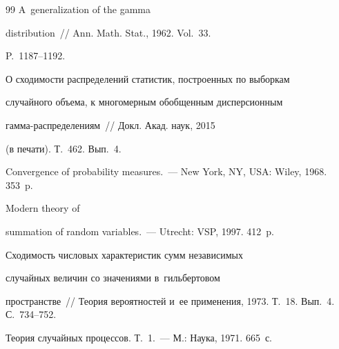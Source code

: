 {{\begin{thebibliography}{99}
 A~generalization of the gamma


distribution~/\!\!/ Ann. Math. Stat., 1962. Vol.~33.


P.~1187--1192.









О сходимости распределений статистик, построенных по выборкам


случайного объема, к многомерным обобщенным дисперсионным


гам\-ма-рас\-пре\-де\-ле\-ни\-ям~/\!\!/ Докл. Акад. наук, 2015


(в печати). Т.~462. Вып.~4.












Convergence of probability measures.~--- New York, NY, USA: Wiley, 1968. 353~p.







 Modern theory of


summation of random variables.~--- Utrecht: VSP, 1997. 412~p.







 Сходимость числовых характеристик сумм независимых


случайных величин со значениями в~гильбертовом


пространстве~/\!\!/ Теория вероятностей и~ее применения, 1973. Т.~18. Вып.~4. С.~734--752.









Теория случайных процессов. Т.~1.~--- М.: Наука, 1971. 665~с.


\end{thebibliography}


} }








